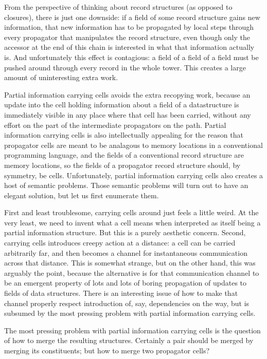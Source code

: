 \documentclass[12pt,letterpaper]{article}
\begin{document}
From the perspective of thinking about record structures (as opposed
to closures), there is just one downside: if a field of some record
structure gains new information, that new information has to be
propagated by local steps through every propagator that manipulates
the record structure, even though only the accessor at the end of this
chain is interested in what that information actually is.  And
unfortunately this effect is contagious: a field of a field of a field
must be pushed around through every record in the whole tower.  This
creates a large amount of uninteresting extra work.

Partial information carrying cells avoids the extra recopying work,
because an update into the cell holding information about a field of a
datastructure is immediately visible in any place where that cell has
been carried, without any effort on the part of the intermediate
propagators on the path.  Partial information carrying cells is also
intellectually appealing for the reason that propagator cells are
meant to be analagous to memory locations in a conventional
programming language, and the fields of a conventional record
structure are memory locations, so the fields of a propagator record
structure should, by symmetry, be cells.  Unfortunately, partial
information carrying cells also creates a host of semantic problems.
Those semantic problems will turn out to have an elegant solution, but
let us first enumerate them.

First and least troublesome, carrying cells around just feels a little
weird.  At the very least, we need to invent what a cell means when
interpreted as itself being a partial information structure.  But this
is a purely aesthetic concern.  Second, carrying cells introduces
creepy action at a distance: a cell can be carried arbitrarily far,
and then becomes a channel for instantaneous communication across that
distance.  This is somewhat strange, but on the other hand, this was
arguably the point, because the alternative is for that communication
channel to be an emergent property of lots and lots of boring
propagation of updates to fields of data structures.  There is an
interesting issue of how to make that channel properly respect
introduction of, say, dependencies on the way, but is subsumed by the
most pressing problem with partial information carrying cells.

The most pressing problem with partial information carrying cells is
the question of how to merge the resulting structures.  Certainly a
pair should be merged by merging its constituents; but how to merge
two propagator cells?
\end{document}
